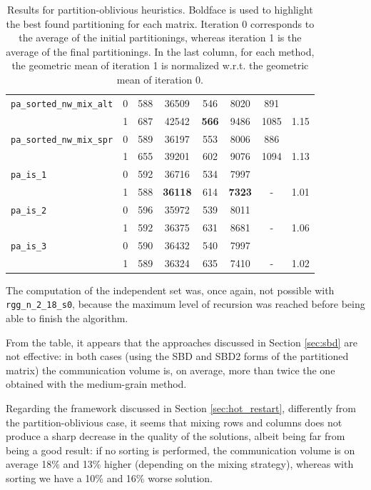 \begin{table}[h]
\begin{tabular}{|l|c||c|c|c|c|c||c|}
		\verb|pa_sorted_nw_mix_alt| & 0 & 588 & 36509 & 546 & 8020 & 891 & \\ %
		& 1 &  687 & 42542 & \textbf{566} & 9486 & 1085 & 1.15 \\ \hline %
		
		\verb|pa_sorted_nw_mix_spr| & 0 & 589 & 36197 & 553 & 8006  & 886 & \\ %
		& 1 &  655 & 39201 & 602 & 9076 & 1094 & 1.13 \\ \hline %
		
		\verb|pa_is_1| & 0 & 592 & 36716 & 534 & 7997 & & \\ %
		& 1 & 588 & \textbf{36118} & 614 & \textbf{7323} & - & 1.01 \\ \hline %
		
		\verb|pa_is_2| & 0 & 596 & 35972 &  539 & 8011 &  & \\ %
		& 1 & 592 & 36375 &  631 & 8681 & - & 1.06 \\ \hline %
		
		\verb|pa_is_3| & 0 & 590 & 36432 & 540 & 7997 & & \\ %
		& 1 & 589 & 36324 & 635 & 7410 & - & 1.02\\ \hline %

	\end{tabular}
	\caption{Results for partition-oblivious heuristics. Boldface is used to highlight the best found partitioning for each matrix. Iteration 0 corresponds to the average of the initial partitionings, whereas iteration 1 is the average of the final partitionings. In the last column, for each method, the geometric mean of iteration 1 is normalized w.r.t. the geometric mean of iteration 0.} \label{tab:preliminary_pa}
\end{table}

The computation of the independent set was, once again, not possible with \verb|rgg_n_2_18_s0|, because the maximum level of recursion was reached before being able to finish the algorithm.

From the table, it appears that the approaches discussed in Section \ref{sec:sbd} are not effective: in both cases (using the SBD and SBD2 forms of the partitioned matrix) the communication volume is, on average, more than twice the one obtained with the medium-grain method. 

Regarding the framework discussed in Section \ref{sec:hot_restart}, differently from the partition-oblivious case, it seems that mixing rows and columns does not produce a sharp decrease in the quality of the solutions, albeit being far from being a good result: if no sorting is performed, the communication volume is on average 18\% and 13\% higher (depending on the mixing strategy), whereas with sorting we have a 10\% and 16\% worse solution.

